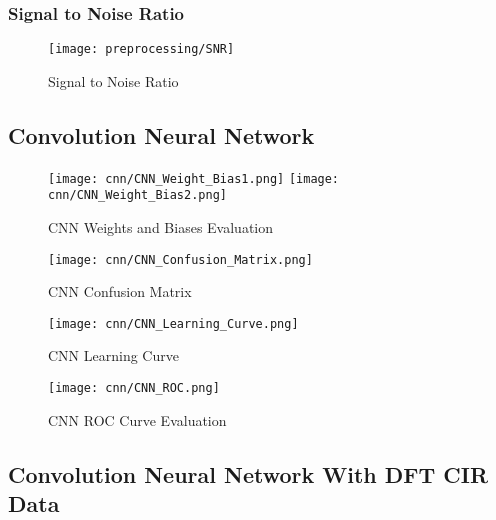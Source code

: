 \subsubsection{Signal to Noise Ratio}\label{snr_visual}

\begin{figure}[H] %
	\centering %
	\texttt{[image: preprocessing/SNR]} %
	\caption{Signal to Noise Ratio}\label{fig:snr}
\end{figure}


\subsection{Convolution Neural Network}\label{cnn_visual}

\begin{figure}[H] 
  \centering
  \texttt{[image: cnn/CNN\_Weight\_Bias1.png]}
  \texttt{[image: cnn/CNN\_Weight\_Bias2.png]}
  \caption{CNN Weights and Biases Evaluation}\label{fig:cnn_weight_bias}
\end{figure}

\begin{figure}[H] 
  \centering
  \texttt{[image: cnn/CNN\_Confusion\_Matrix.png]}
  \caption{CNN Confusion Matrix}\label{fig:cnn_confusion_matrix}
\end{figure}

\begin{figure}[H] 
  \centering
  \texttt{[image: cnn/CNN\_Learning\_Curve.png]}
  \caption{CNN Learning Curve}\label{fig:cnn_learning_curve}
\end{figure}

\begin{figure}[H] 
  \centering
  \texttt{[image: cnn/CNN\_ROC.png]}
  \caption{CNN ROC Curve Evaluation}\label{fig:cnn_roc_curve}
\end{figure}

\subsection{Convolution Neural Network With DFT CIR Data}\label{cnn_visual_dft}


